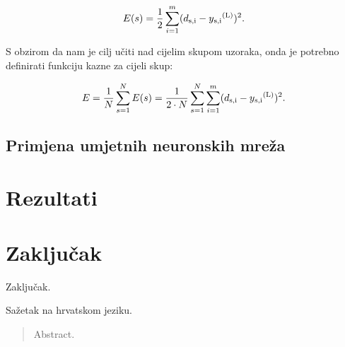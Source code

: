 \documentclass[times, utf8, zavrsni]{fer}
\begin{document}
\begin{equation}
    \label{eq:sample-err}
    E(s) = \frac{1}{2}\sum\limits_{i=1}^m(d\textsubscript{s,i} - y\textsubscript{s,i}\textsuperscript{(L)})^2.
\end{equation}

S obzirom da nam je cilj učiti nad cijelim skupom uzoraka, onda je potrebno definirati funkciju kazne za cijeli skup:

\begin{equation}
    \label{eq:err}
    E = \frac{1}{N}\sum\limits_{s=1}^NE(s) = \frac{1}{2\cdot{N}}\sum\limits_{s=1}^N\sum\limits_{i=1}^m(d\textsubscript{s,i} - y\textsubscript{s,i}\textsuperscript{(L)})^2.
\end{equation}

\section{Primjena umjetnih neuronskih mreža}

\chapter{Rezultati}

\chapter{Zaključak}
Zaključak.




\begin{sazetak}
Sažetak na hrvatskom jeziku.

\end{sazetak}

\begin{abstract}
Abstract.

\end{abstract}
\end{document}
